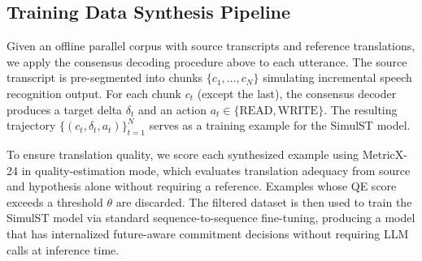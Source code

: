 \subsection{Training Data Synthesis Pipeline}

Given an offline parallel corpus with source transcripts and reference
translations, we apply the consensus decoding procedure above to each
utterance. The source transcript is pre-segmented into chunks
$\{c_1, \dots, c_N\}$ simulating incremental speech recognition output.
For each chunk $c_t$ (except the last), the consensus decoder produces a
target delta $\delta_t$ and an action $a_t \in \{\text{READ}, \text{WRITE}\}$.
The resulting trajectory
$\{(c_t, \delta_t, a_t)\}_{t=1}^{N}$ serves as a training example for the
SimulST model.

To ensure translation quality, we score each synthesized example using
MetricX-24 in quality-estimation mode, which evaluates translation
adequacy from source and hypothesis alone without requiring a reference.
Examples whose QE score exceeds a threshold $\theta$ are discarded. The
filtered dataset is then used to train the SimulST model via standard
sequence-to-sequence fine-tuning, producing a model that has internalized
future-aware commitment decisions without requiring LLM calls at inference
time.
